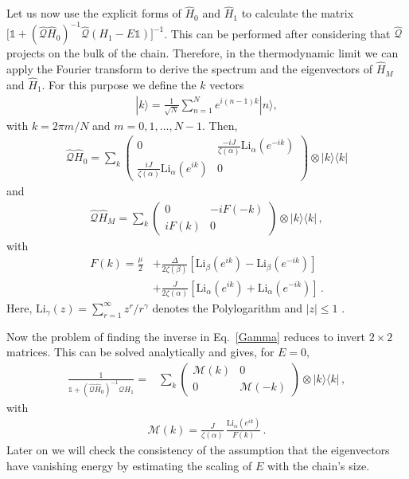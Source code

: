 \documentclass[pra,twocolumn,
superscriptaddress,
showpacs,
aps
]{revtex4-1}
\begin{document}
Let us now use the explicit forms of $\hat{H}_0$ and $\hat{H}_1$ to calculate the matrix ${\big[\mathbb{1}+(\hat{\mathcal{Q}}\hat{H}_0)^{-1}\hat{\mathcal{Q}}(H_1-E\mathbb{1})\big]^{-1}}$. This can be performed after considering that $\hat{\mathcal{Q}}$ projects on the bulk of the chain. 
Therefore, in the thermodynamic limit we can apply the Fourier transform to derive the spectrum and the eigenvectors of $\hat{H}_M$ and $\hat{H}_1$. For this purpose we define the $k$ vectors
\begin{align*}
|k\rangle=\frac{1}{\sqrt{N}}\sum_{n=1}^Ne^{i(n-1)k}|n\rangle,
\end{align*}
with $k=2\pi m/N$ and $m=0,1,\dots,N-1$. Then, 
\begin{align*}
\hat{\mathcal{Q}}\hat{H}_{0}=\sum_{k}\begin{pmatrix}
0&\frac{-iJ}{\zeta(\alpha)}\mathrm{Li}_\alpha(e^{-ik})\\
\frac{iJ}{\zeta(\alpha)}\mathrm{Li}_\alpha(e^{ik})&0
\end{pmatrix}\otimes|k\rangle\langle k|
\end{align*}
and 
\begin{align*}
\hat{\mathcal{Q}}\hat{H}_{M}=\sum_{k}\begin{pmatrix}
0&-iF(-k)\\
iF(k)&0
\end{pmatrix}\otimes|k\rangle\langle k|\,,
\end{align*}
with
\begin{align}
F(k)=\frac{\mu}{2}&+\frac{\Delta}{2\zeta(\beta)}\left[\mathrm{Li}_\beta(e^{ik})-\mathrm{Li}_\beta(e^{-ik})\right]\nonumber\\
&+\frac{J}{2\zeta(\alpha)}\left[\mathrm{Li}_\alpha(e^{ik})+\mathrm{Li}_\alpha(e^{-ik})\right]\,.\label{Fk}
\end{align}
Here, $\mathrm{Li}_{\gamma}(z)=\sum_{r=1}^\infty z^r/r^\gamma$ denotes the Polylogarithm and $|z|\leq1$ \cite{Olver:2010}. 

Now the problem of finding the inverse in Eq.~\eqref{Gamma} reduces to invert $2\times 2$ matrices. This can be solved analytically and gives, for $E=0$, 
\begin{align}
\frac{1}{\mathbb{1}+(\hat{\mathcal{Q}}\hat{H}_0)^{-1}\mathcal{Q}H_1}=&\sum_k\begin{pmatrix}
{\mathcal M}(k)&0\\
0&{\mathcal M}(-k)
\end{pmatrix}\otimes |k\rangle\langle k|\,,\label{M}
\end{align}
with 
\begin{align}
{\mathcal M}(k)=\frac{J}{\zeta(\alpha)}\,\frac{\mathrm{Li}_\alpha(e^{ik})}{F(k)}\,.\label{Mk}
\end{align}
Later on we will check the consistency of the assumption that the eigenvectors have vanishing energy by estimating the scaling of $E$ with the chain's size.
\end{document}
